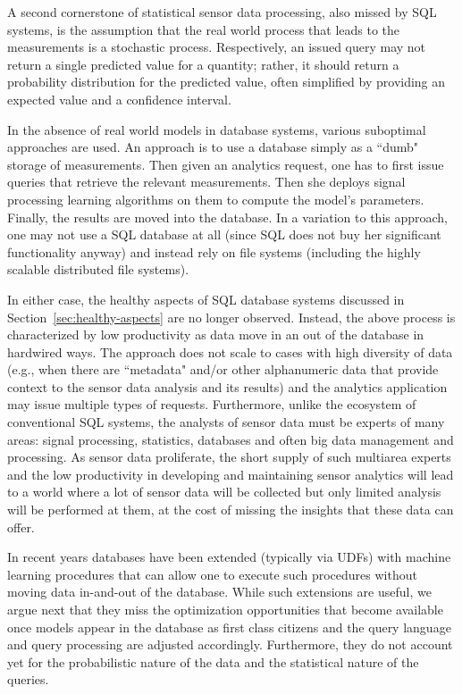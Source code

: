 A second cornerstone of statistical sensor data processing, also missed by SQL systems, is the assumption that the real world process that leads to the measurements is a stochastic process. Respectively, an issued query may not return a single predicted value for a quantity; rather, it should return a probability distribution for the predicted value, often simplified by providing an expected value and a confidence interval.

In the absence of real world models in database systems, various suboptimal approaches are used. An approach is to use a database simply as a ``dumb" storage of measurements. Then
given an analytics request, one has to first issue queries that retrieve the relevant measurements. Then she deploys signal processing learning algorithms on them to compute the model's parameters. Finally,  the results are moved into the database. In a variation to this approach, one may not use a SQL database at all (since SQL does not buy her significant functionality anyway) and instead rely on file systems (including the highly scalable distributed file systems). 

In either case, the healthy aspects of SQL database systems discussed in Section~\ref{sec:healthy-aspects} are no longer observed. Instead, the above process is characterized by low productivity as data move in an out of the database in hardwired ways. The approach does not scale to cases with high diversity of data (e.g., when there are ``metadata" and/or other alphanumeric data that provide context to the sensor data analysis and its results) and the analytics application may issue multiple types of  requests. Furthermore, unlike the ecosystem of conventional SQL systems, the analysts of sensor data must be experts of many areas: signal processing, statistics, databases and often big data management and processing. As sensor data proliferate, the short supply of such multiarea experts and the low productivity in developing and maintaining sensor analytics will lead to a world where a lot of sensor data will be collected but only limited analysis will be performed at them, at the cost of missing the insights that these data can offer.


In recent years databases have been extended (typically via UDFs) with machine learning procedures that can allow one to execute such procedures without moving data in-and-out of the database. While such extensions are useful, we argue next that they miss the optimization opportunities that become available once models appear in the database as first class citizens and the query language and query processing are adjusted accordingly. Furthermore, they do not account yet for the probabilistic nature of the data and the statistical nature of the queries.

